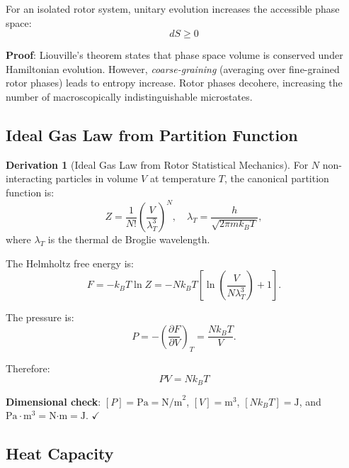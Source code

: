 \documentclass[12pt,a4paper]{article}
\theoremstyle{definition}
\newtheorem{derivation}{Derivation}[section]
\theoremstyle{remark}
\begin{document}
For an isolated rotor system, unitary evolution increases the accessible phase space:
\begin{equation}
\boxed{dS \geq 0}
\end{equation}

\textbf{Proof}: Liouville's theorem states that phase space volume is conserved under Hamiltonian evolution. However, \emph{coarse-graining} (averaging over fine-grained rotor phases) leads to entropy increase. Rotor phases decohere, increasing the number of macroscopically indistinguishable microstates.

\subsection{Ideal Gas Law from Partition Function}

\begin{derivation}[Ideal Gas Law from Rotor Statistical Mechanics]

For $N$ non-interacting particles in volume $V$ at temperature $T$, the canonical partition function is:
\begin{equation}
Z = \frac{1}{N!} \left(\frac{V}{\lambda_T^3}\right)^N, \quad \lambda_T = \frac{h}{\sqrt{2\pi m k_B T}},
\end{equation}
where $\lambda_T$ is the thermal de Broglie wavelength.

The Helmholtz free energy is:
\begin{equation}
F = -k_B T \ln Z = -Nk_B T \left[\ln\left(\frac{V}{N\lambda_T^3}\right) + 1\right].
\end{equation}

The pressure is:
\begin{equation}
P = -\left(\frac{\partial F}{\partial V}\right)_T = \frac{Nk_B T}{V}.
\end{equation}

Therefore:
\begin{equation}
\boxed{PV = Nk_B T}
\end{equation}

\textbf{Dimensional check}: $[P] = \text{Pa} = \text{N/m}^2$, $[V] = \text{m}^3$, $[Nk_BT] = \text{J}$, and $\text{Pa}·\text{m}^3 = \text{N·m} = \text{J}$. $\checkmark$
\end{derivation}

\subsection{Heat Capacity}
\end{document}
